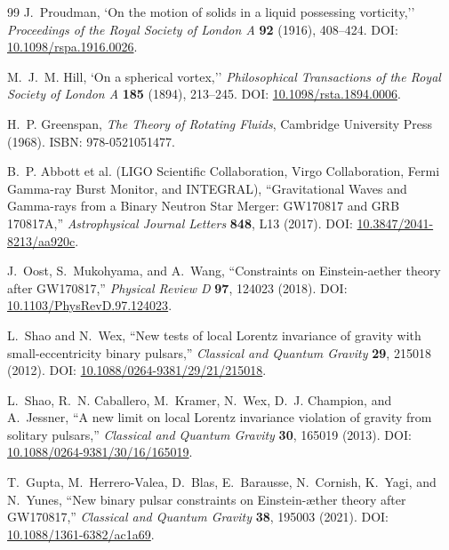 \begin{thebibliography}{99}
J.~Proudman,
`On the motion of solids in a liquid possessing vorticity,''
\emph{Proceedings of the Royal Society of London A} \textbf{92} (1916), 408--424.
DOI: \href{https://doi.org/10.1098/rspa.1916.0026}{10.1098/rspa.1916.0026}.

M.~J.~M. Hill,
`On a spherical vortex,''
\emph{Philosophical Transactions of the Royal Society of London A} \textbf{185} (1894), 213--245.
DOI: \href{https://doi.org/10.1098/rsta.1894.0006}{10.1098/rsta.1894.0006}.

H.~P. Greenspan,
\emph{The Theory of Rotating Fluids},
Cambridge University Press (1968).
ISBN: 978-0521051477.

B.~P. Abbott et al. (LIGO Scientific Collaboration, Virgo Collaboration, Fermi Gamma-ray Burst Monitor, and INTEGRAL),
``Gravitational Waves and Gamma-rays from a Binary Neutron Star Merger: GW170817 and GRB 170817A,''
\emph{Astrophysical Journal Letters} \textbf{848}, L13 (2017).
DOI: \href{https://doi.org/10.3847/2041-8213/aa920c}{10.3847/2041-8213/aa920c}.

J.~Oost, S.~Mukohyama, and A.~Wang,
``Constraints on Einstein-aether theory after GW170817,''
\emph{Physical Review D} \textbf{97}, 124023 (2018).
DOI: \href{https://doi.org/10.1103/PhysRevD.97.124023}{10.1103/PhysRevD.97.124023}.

L.~Shao and N.~Wex,
``New tests of local Lorentz invariance of gravity with small-eccentricity binary pulsars,''
\emph{Classical and Quantum Gravity} \textbf{29}, 215018 (2012).
DOI: \href{https://doi.org/10.1088/0264-9381/29/21/215018}{10.1088/0264-9381/29/21/215018}.

L.~Shao, R.~N. Caballero, M.~Kramer, N.~Wex, D.~J. Champion, and A.~Jessner,
``A new limit on local Lorentz invariance violation of gravity from solitary pulsars,''
\emph{Classical and Quantum Gravity} \textbf{30}, 165019 (2013).
DOI: \href{https://doi.org/10.1088/0264-9381/30/16/165019}{10.1088/0264-9381/30/16/165019}.

T.~Gupta, M.~Herrero-Valea, D.~Blas, E.~Barausse, N.~Cornish, K.~Yagi, and N.~Yunes,
``New binary pulsar constraints on Einstein-\ae ther theory after GW170817,''
\emph{Classical and Quantum Gravity} \textbf{38}, 195003 (2021).
DOI: \href{https://doi.org/10.1088/1361-6382/ac1a69}{10.1088/1361-6382/ac1a69}.

\end{thebibliography}
\fi
